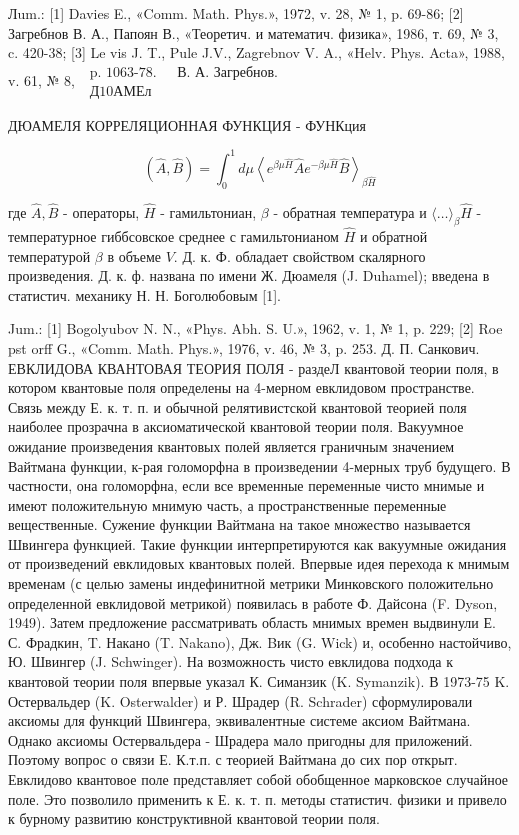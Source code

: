 \documentclass[10pt]{article}
\begin{document}
Лum.: [1] Davies E., «Comm. Math. Phys.», 1972, v. 28, № 1, p. 69-86; [2] Загребнов В. А., Папоян В., «Теоретич. и математич. физика», 1986, т. 69, № 3, c. 420-38; [3] Le vis J. T., Pule J.V., Zagrebnov V. A., «Helv. Phys. Acta», 1988, v. 61, № 8, $\begin{array}{ll}\text { p. 1063-78. } & \text { В. А. Загребнов. } \\ \text { Д10АМЕл }\end{array}$



ДЮАМЕЛЯ КОРРЕЛЯЦИОННАЯ ФУНКЦИЯ - ФУНКция



\[

(\hat{A}, \hat{B})=\int_{0}^{1} d \mu\left\langle e^{\beta \mu \hat{H}} \hat{A} e^{-\beta \mu \hat{H}} \hat{B}\right\rangle_{\beta \hat{H}}

\]



где $\hat{A}, \hat{B}$ - операторы, $\hat{H}$ - гамильтониан, $\beta$ - обратная температура и $\langle\ldots\rangle_{\beta} \hat{H}$ - температурное гиббсовское среднее с гамильтонианом $\hat{H}$ и обратной температурой $\beta$ в объеме $V$. Д. к. Ф. обладает свойством скалярного произведения. Д. к. ф. названа по имени Ж. Дюамеля (J. Duhamel); введена в статистич. механику Н. Н. Боголюбовым [1].



Jum.: [1] Bogolyubov N. N., «Phys. Abh. S. U.», 1962, v. 1, № 1, p. 229; [2] Roe pst orff G., «Comm. Math. Phys.», 1976, v. 46, № 3, p. 253. Д. П. Санкович. ЕВКЛИДОВА КВАНТОВАЯ ТЕОРИЯ ПОЛЯ - раздеЛ квантовой теории поля, в котором квантовые поля определены на 4-мерном евклидовом пространстве. Связь между Е. к. т. п. и обычной релятивистской квантовой теорией поля наиболее прозрачна в аксиоматической квантовой теории поля. Вакуумное ожидание произведения квантовых полей является граничным значением Вайтмана функции, к-рая голоморфна в произведении 4-мерных труб будущего. В частности, она голоморфна, если все временные переменные чисто мнимые и имеют положительную мнимую часть, а пространственные переменные вещественные. Сужение функции Вайтмана на такое множество называется Швингера функцией. Такие функции интерпретируются как вакуумные ожидания от произведений евклидовых квантовых полей. Впервые идея перехода к мнимым временам (с целью замены индефинитной метрики Минковского положительно определенной евклидовой метрикой) появилась в работе Ф. Дайсона (F. Dyson, 1949). Затем предложение рассматривать область мнимых времен выдвинули Е. С. Фрадкин, T. Накано (T. Nakano), Дж. Bик (G. Wick) и, особенно настойчиво, Ю. Швингер (J. Schwinger). На возможность чисто евклидова подхода к квантовой теории поля впервые указал К. Симанзик (K. Symanzik). В 1973-75 K. Остервальдер (K. Osterwalder) и Р. Шрадер (R. Schrader) сформулировали аксиомы для функций Швингера, эквивалентные системе аксиом Вайтмана. Однако аксиомы Остервальдера - Шрадера мало пригодны для приложений. Поэтому вопрос о связи Е. К.т.п. с теорией Вайтмана до сих пор открыт. Евклидово квантовое поле представляет собой обобщенное марковское случайное поле. Это позволило применить к Е. к. т. п. методы статистич. физики и привело к бурному развитию конструктивной квантовой теории поля.
\end{document}
